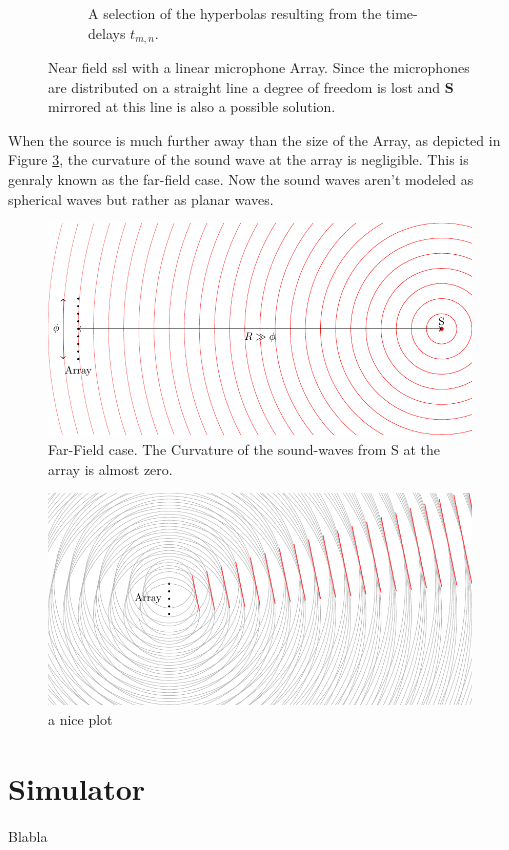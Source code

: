 \begin{figure}
\begin{subfigure}[b]{0.45\textwidth}
    \caption{A selection of the hyperbolas resulting from the time-delays $t_{m,n}$.}
    \label{ssl:fig:hyperbola}
  \end{subfigure}
  \caption{Near field \acrshort{ssl} with a linear microphone Array. 
  Since the microphones are distributed on a straight line a degree of freedom is lost and
  $\bm{S}$ mirrored at this line is also a possible solution.}
  \label{fig:three graphs}
\end{figure}

When the source is much further away than the size of the Array, as depicted
in Figure \ref{ssl:fig:far field}, the curvature of the sound wave at the array is negligible.
This is genraly known as the far-field case.
Now the sound waves aren't modeled as spherical waves but rather as planar waves.




\begin{figure}
  \centering
  \includegraphics[]{FarField.pdf}
  \caption{Far-Field case. The Curvature of the sound-waves from S at the array
  is almost zero.}
  \label{ssl:fig:far field}
\end{figure}



\begin{figure}
  \centering
  \includegraphics[]{beamforming_1.pdf}
  \caption{a nice plot}
  \label{fig:mesh1}
\end{figure}

\newpage
\section{Simulator}
Blabla
